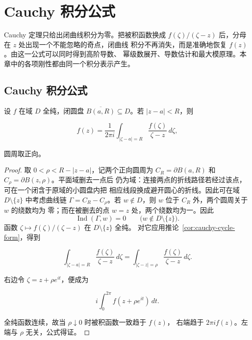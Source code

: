\chapter{Cauchy 积分公式}
\label{chap:cauchy-integral-formula}

Cauchy 定理只给出闭曲线积分为零。把被积函数换成
\(f(\zeta)/(\zeta-z)\) 后，分母在 \(z\) 处出现一个不能忽略的奇点，闭曲线
积分不再消失，而是准确地恢复 \(f(z)\)。由这一公式可以同时得到高阶导数、
幂级数展开、导数估计和最大模原理。本章中的各项刚性都由同一个积分表示产生。

\section{Cauchy 积分公式}

\begin{theorem}
\label{thm:cauchy-integral-circle}
设 \(f\) 在域 \(D\) 全纯，闭圆盘
\(\overline{B(a,R)}\subseteq D\)。若 \(|z-a|<R\)，则

\begin{equation}
 f(z)=\frac1{2\pi i}\int_{|\zeta-a|=R}
 \frac{f(\zeta)}{\zeta-z}\,d\zeta,
 \label{eq:cauchy-integral-circle}
\end{equation}

圆周取正向。
\end{theorem}

\begin{proof}
取 \(0<\rho<R-|z-a|\)，记两个正向圆周为
\(C_R=\partial B(a,R)\) 和 \(C_\rho=\partial B(z,\rho)\)。平面域删去一点后
仍为域：连接两点的折线路径若经过该点，可在一个闭含于原域的小圆盘内把
相应线段换成避开圆心的折线。因此可在域 \(D\setminus\{z\}\) 中考虑曲线链
\(\Gamma=C_R-C_\rho\)。若
\(w\notin D\)，则 \(w\) 位于 \(C_R\) 外，两个圆周关于 \(w\) 的绕数均为
零；而在被删去的点 \(w=z\) 处，两个绕数均为一。因此
\[
 \operatorname{Ind}(\Gamma,w)=0
 \qquad\bigl(w\notin D\setminus\{z\}\bigr).
\]
函数 \(\zeta\mapsto f(\zeta)/(\zeta-z)\) 在 \(D\setminus\{z\}\) 全纯。
对它应用推论~\ref{cor:cauchy-cycle-form}，得到

\[
 \int_{|\zeta-a|=R}\frac{f(\zeta)}{\zeta-z}\,d\zeta
 =\int_{|\zeta-z|=\rho}\frac{f(\zeta)}{\zeta-z}\,d\zeta.
\]

右边令 \(\zeta=z+\rho e^{it}\)，便成为

\[
 i\int_0^{2\pi}f(z+\rho e^{it})\,dt.
\]

全纯函数连续，故当 \(\rho\downarrow0\) 时被积函数一致趋于 \(f(z)\)，
右端趋于 \(2\pi i f(z)\)。左端与 \(\rho\) 无关，公式得证。
\end{proof}

